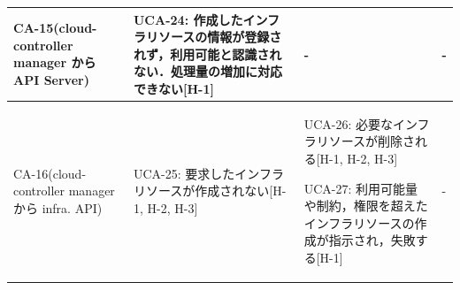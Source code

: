 \documentclass[12pt,a4j]{ujreport}
\begin{document}
\begin{footnotesize}
\begin{tabularx}{\linewidth}{
            >{\hsize=0.7\hsize}X|
            >{\hsize=1.1\hsize}X|
            >{\hsize=1.1\hsize}X|
            >{\hsize=1.1\hsize}X
        }
        CA-15(cloud-controller manager から API Server)               & UCA-24: 作成したインフラリソースの情報が登録されず，利用可能と認識されない．処理量の増加に対応できない[H-1]                                                                                                                                                                                                                                                                                                                                                                                                & -                                                                                                                                                                                                                                                                                                                               & -                                                                                                                                    \\ \hline
        CA-16(cloud-controller manager から infra. API)               & UCA-25: 要求したインフラリソースが作成されない[H-1, H-2, H-3]                                                                                                                                                                                                                                                                                                                                                                                                                                              & UCA-26: 必要なインフラリソースが削除される[H-1, H-2, H-3]\par\noindent UCA-27: 利用可能量や制約，権限を超えたインフラリソースの作成が指示され，失敗する[H-1]                                                                                                                                                                    & -                                                                                                                                    \\ \hline

\end{tabularx}
\end{footnotesize}
\end{document}

